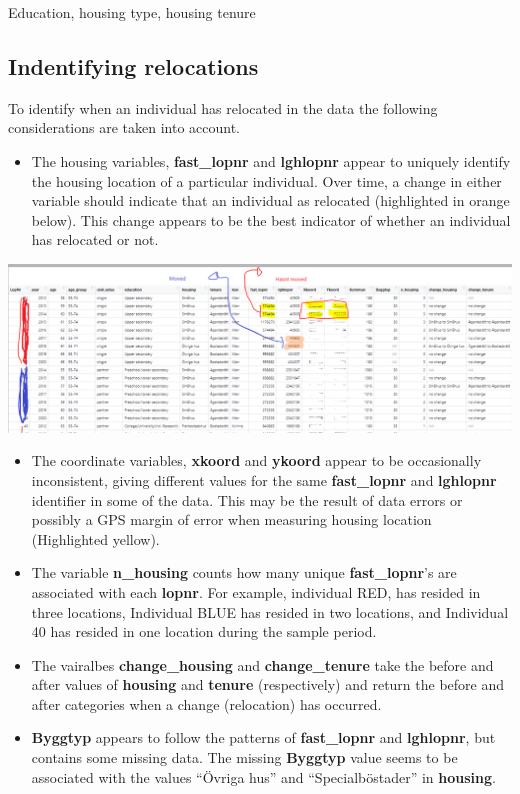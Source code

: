 \documentclass[
]{book}
\providecommand{\tightlist}{%
  \setlength{\itemsep}{0pt}\setlength{\parskip}{0pt}}
\begin{document}
Education, housing type, housing tenure

\hypertarget{indentifying-relocations}{%
\subsection{Indentifying relocations}\label{indentifying-relocations}}

To identify when an individual has relocated in the data the following considerations are taken into account.

\begin{itemize}
\tightlist
\item
  The housing variables, \textbf{fast\_lopnr} and \textbf{lghlopnr} appear to uniquely identify the housing location of a particular individual. Over time, a change in either variable should indicate that an individual as relocated (highlighted in orange below). This change appears to be the best indicator of whether an individual has relocated or not.
\end{itemize}

\includegraphics[width=1\linewidth]{output/figures/relocation_id}

\begin{itemize}
\item
  The coordinate variables, \textbf{xkoord} and \textbf{ykoord} appear to be occasionally inconsistent, giving different values for the same \textbf{fast\_lopnr} and \textbf{lghlopnr} identifier in some of the data. This may be the result of data errors or possibly a GPS margin of error when measuring housing location (Highlighted yellow).
\item
  The variable \textbf{n\_housing} counts how many unique \textbf{fast\_lopnr}'s are associated with each \textbf{lopnr}. For example, individual RED, has resided in three locations, Individual BLUE has resided in two locations, and Individual 40 has resided in one location during the sample period.
\item
  The vairalbes \textbf{change\_housing} and \textbf{change\_tenure} take the before and after values of \textbf{housing} and \textbf{tenure} (respectively) and return the before and after categories when a change (relocation) has occurred.
\item
  \textbf{Byggtyp} appears to follow the patterns of \textbf{fast\_lopnr} and \textbf{lghlopnr}, but contains some missing data. The missing \textbf{Byggtyp} value seems to be associated with the values ``Övriga hus'' and ``Specialböstader'' in \textbf{housing}.
\end{itemize}
\end{document}
